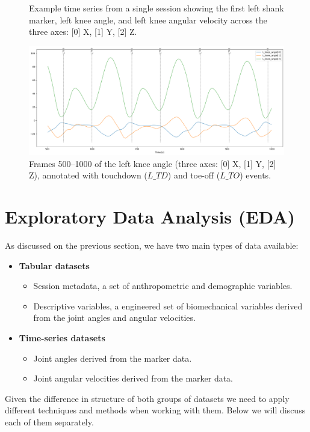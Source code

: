 \begin{figure}[ht]
\begin{minipage}[t]{0.48\textwidth}
        \caption{Example time series from a single session showing the first left shank marker, left knee angle, and left knee angular velocity across the three axes: [0] X, [1] Y, [2] Z.}
        \label{fig:data-ext-marker-velo-angle-ts}
    \end{minipage}
\end{figure}

\begin{figure}[ht]
    \centering
    \includegraphics[width=0.5\columnwidth]{images/ex_l_knee_angle_events.png}
    \caption{Frames 500--1000 of the left knee angle (three axes: [0] X, [1] Y, [2] Z), annotated with touchdown (\(L\_TD\)) and toe-off (\(L\_TO\)) events.}
    \label{fig:data-ext-l-knee-angle-events}
\end{figure}


\section{Exploratory Data Analysis (EDA)}\label{sec:method-eda}
As discussed on the previous section, we have two main types of data available:

\begin{itemize}
    \item \textbf{Tabular datasets}
    \begin{itemize}
        \item Session metadata, a set of anthropometric and demographic variables.
        \item Descriptive variables, a engineered set of biomechanical variables derived from the joint angles and angular velocities.
    \end{itemize}
    \item \textbf{Time-series datasets}
    \begin{itemize}
        \item Joint angles derived from the marker data.
        \item Joint angular velocities derived from the marker data.
    \end{itemize}
\end{itemize}

Given the difference in structure of both groups of datasets we need to apply different techniques and methods when working with them. Below we will discuss each of them separately.

